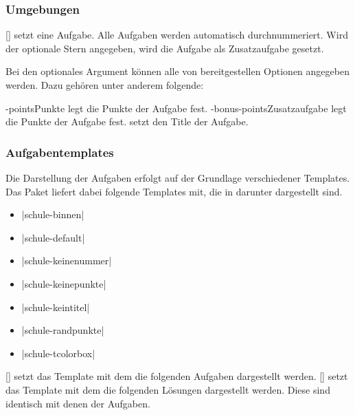 \subsubsection{Umgebungen}
\begin{environments}
    []%
        setzt eine Aufgabe. Alle Aufgaben werden automatisch durchnummeriert. Wird der optionale Stern angegeben, wird die Aufgabe als Zusatzaufgabe gesetzt.

        Bei den optionales Argument können alle von  bereitgestellen Optionen angegeben werden. Dazu gehören unter anderem folgende:
        \begin{options}
            \keyval-{points}{Punkte} legt die Punkte der Aufgabe fest.
            \keyval-{bonus-points}{Zusatzaufgabe} legt die Punkte der Aufgabe fest.
             setzt den Title der Aufgabe.
        \end{options}
\end{environments}

\subsubsection{Aufgabentemplates}
    Die Darstellung der Aufgaben erfolgt auf der Grundlage verschiedener Templates. Das Paket  liefert dabei folgende Templates mit, die in darunter dargestellt sind.
    \begin{itemize}
        \item \verbcode|schule-binnen|
        \item \verbcode|schule-default|
        \item \verbcode|schule-keinenummer|
        \item \verbcode|schule-keinepunkte|
        \item \verbcode|schule-keintitel|
        \item \verbcode|schule-randpunkte|
        \item \verbcode|schule-tcolorbox|
    \end{itemize}


    \begin{commands}
        [] setzt das Template mit dem die folgenden Aufgaben dargestellt werden.
        [] setzt das Template mit dem die folgenden Lösungen dargestellt werden. Diese sind identisch mit denen der Aufgaben.
    \end{commands}

